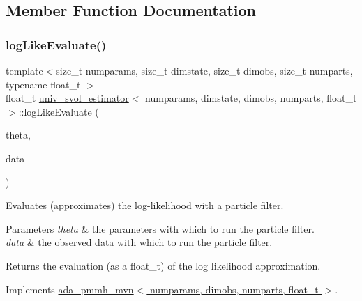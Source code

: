 \subsection{Member Function Documentation}
\mbox{\label{classuniv__svol__estimator_a1223321e7875a4d40f9c4817753a2e01}} 
\subsubsection{\texorpdfstring{log\+Like\+Evaluate()}{logLikeEvaluate()}}
{\footnotesize\ttfamily template$<$size\+\_\+t numparams, size\+\_\+t dimstate, size\+\_\+t dimobs, size\+\_\+t numparts, typename float\+\_\+t $>$ \\
float\+\_\+t \hyperlink{classuniv__svol__estimator}{univ\+\_\+svol\+\_\+estimator}$<$ numparams, dimstate, dimobs, numparts, float\+\_\+t $>$\+::log\+Like\+Evaluate (\begin{DoxyParamCaption}\item[{const \hyperlink{classparamPack}{param\+Pack}$<$ float\+\_\+t $>$ \&}]{theta,  }\item[{const std\+::vector$<$ osv $>$ \&}]{data }\end{DoxyParamCaption})\hspace{0.3cm}{\ttfamily [virtual]}}



Evaluates (approximates) the log-\/likelihood with a particle filter. 


\begin{DoxyParams}{Parameters}
{\em theta} & the parameters with which to run the particle filter. \\
\hline
{\em data} & the observed data with which to run the particle filter. \\
\hline
\end{DoxyParams}
\begin{DoxyReturn}{Returns}
the evaluation (as a float\+\_\+t) of the log likelihood approximation. 
\end{DoxyReturn}


Implements \hyperlink{classada__pmmh__mvn_a82d43085173fd0ed33ee42de9be48b77}{ada\+\_\+pmmh\+\_\+mvn$<$ numparams, dimobs, numparts, float\+\_\+t $>$}.

\mbox{\label{classuniv__svol__estimator_a2e0e55bf061ca8f59fa5d42ae6495fdd}} 
